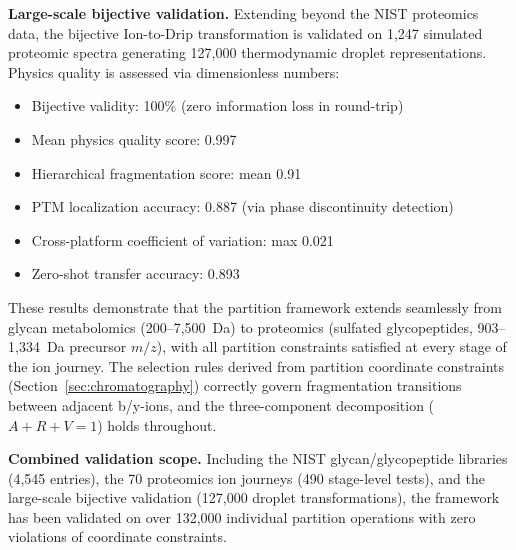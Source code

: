 \documentclass[twocolumn,10pt,a4paper]{article}
\theoremstyle{definition}
\theoremstyle{remark}
\begin{document}
\textbf{Large-scale bijective validation.} Extending beyond the NIST proteomics data, the bijective Ion-to-Drip transformation is validated on 1,247 simulated proteomic spectra generating 127,000 thermodynamic droplet representations. Physics quality is assessed via dimensionless numbers:
\begin{itemize}[nosep]
    \item Bijective validity: 100\% (zero information loss in round-trip)
    \item Mean physics quality score: 0.997
    \item Hierarchical fragmentation score: mean 0.91
    \item PTM localization accuracy: 0.887 (via phase discontinuity detection)
    \item Cross-platform coefficient of variation: max 0.021
    \item Zero-shot transfer accuracy: 0.893
\end{itemize}

These results demonstrate that the partition framework extends seamlessly from glycan metabolomics (200--7,500~Da) to proteomics (sulfated glycopeptides, 903--1,334~Da precursor $m/z$), with all partition constraints satisfied at every stage of the ion journey. The selection rules derived from partition coordinate constraints (Section~\ref{sec:chromatography}) correctly govern fragmentation transitions between adjacent b/y-ions, and the three-component decomposition ($A + R + V = 1$) holds throughout.

\textbf{Combined validation scope.} Including the NIST glycan/glycopeptide libraries (4,545 entries), the 70 proteomics ion journeys (490 stage-level tests), and the large-scale bijective validation (127,000 droplet transformations), the framework has been validated on over 132,000 individual partition operations with zero violations of coordinate constraints.
\end{document}
